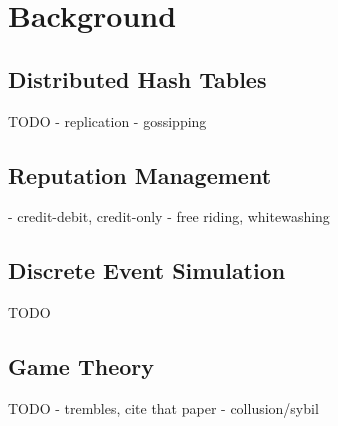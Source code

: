 \chapter{Background}
\section{Distributed Hash Tables}
TODO
- replication
- gossipping
\section{Reputation Management}
- credit-debit, credit-only
- free riding, whitewashing
\section{Discrete Event Simulation}
TODO
\section{Game Theory}
TODO
- trembles, cite that paper
- collusion/sybil

